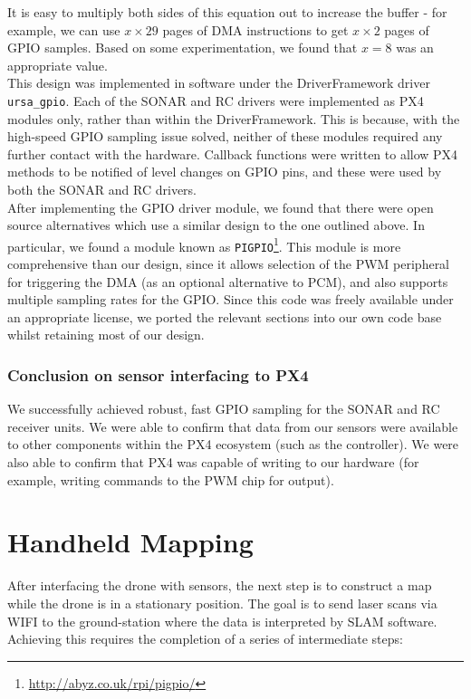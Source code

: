 \documentclass[capstone_report.tex]{subfiles}
\begin{document}
    It is easy to multiply both sides of this equation out to increase the buffer - for example, we can use $x \times 29$ pages of DMA instructions to get $x \times 2$ pages of GPIO samples. Based on some experimentation, we found that $x=8$ was an appropriate value.\\

    This design was implemented in software under the DriverFramework driver \texttt{ursa\_gpio}. Each of the SONAR and RC drivers were implemented as PX4 modules only, rather than within the DriverFramework. This is because, with the high-speed GPIO sampling issue solved, neither of these modules required any further contact with the hardware. Callback functions were written to allow PX4 methods to be notified of level changes on GPIO pins, and these were used by both the SONAR and RC drivers. \\

    After implementing the GPIO driver module, we found that there were open source alternatives which use a similar design to the one outlined above. In particular, we found a module known as \texttt{PIGPIO}\footnote{\url{http://abyz.co.uk/rpi/pigpio/}}. This module is more comprehensive than our design, since it allows selection of the PWM peripheral for triggering the DMA (as an optional alternative to PCM), and also supports multiple sampling rates for the GPIO. Since this code was freely available under an appropriate license, we ported the relevant sections into our own code base whilst retaining most of our design.

    \subsubsection{Conclusion on sensor interfacing to PX4}
    We successfully achieved robust, fast GPIO sampling for the SONAR and RC receiver units. We were able to confirm that data from our sensors were available to other components within the PX4 ecosystem (such as the controller). We were also able to confirm that PX4 was capable of writing to our hardware (for example, writing commands to the PWM chip for output).

\section{Handheld Mapping}

After interfacing the drone with sensors, the next step is to construct a map while the drone is in a stationary position.   The goal is to send laser scans via WIFI to the ground-station where the data is interpreted by SLAM software.  Achieving this requires the completion of a series of intermediate steps:
\end{document}
